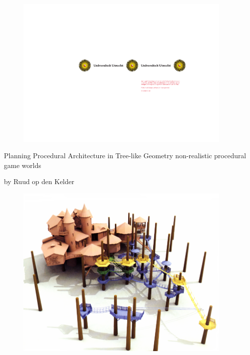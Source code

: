 
\begin{titlepage}
   
\begin{figure}[htbp]
\centering
\includegraphics[width=400px]{images/UULogoSolRight.pdf}
\end{figure}
   
   
    	\begin{center}
    			\large{Planning Procedural Architecture in Tree-like Geometry} \newline
    			\normalsize{non-realistic procedural game worlds}
    	\end{center}
    	
   	 	\begin{center}
    			by Ruud op den Kelder
    	\end{center}
    	
    	
\begin{figure}[htbp]
\centering
\includegraphics[width=400px]{images/titlepage_image.png}
\end{figure}
   
   
\end{titlepage} 